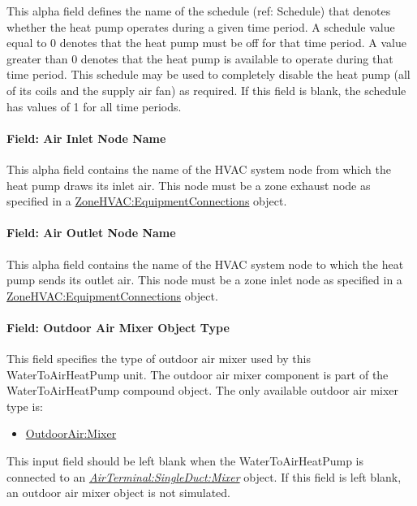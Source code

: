 This alpha field defines the name of the schedule (ref: Schedule) that denotes whether the heat pump operates during a given time period. A schedule value equal to 0 denotes that the heat pump must be off for that time period. A value greater than 0 denotes that the heat pump is available to operate during that time period. This schedule may be used to completely disable the heat pump (all of its coils and the supply air fan) as required. If this field is blank, the schedule has values of 1 for all time periods.

\paragraph{Field: Air Inlet Node Name}\label{field-air-inlet-node-name-8-000}

This alpha field contains the name of the HVAC system node from which the heat pump draws its inlet air. This node must be a zone exhaust node as specified in a \hyperref[zonehvacequipmentconnections]{ZoneHVAC:EquipmentConnections} object.

\paragraph{Field: Air Outlet Node Name}\label{field-air-outlet-node-name-8-001}

This alpha field contains the name of the HVAC system node to which the heat pump sends its outlet air. This node must be a zone inlet node as specified in a \hyperref[zonehvacequipmentconnections]{ZoneHVAC:EquipmentConnections} object.

\paragraph{Field: Outdoor Air Mixer Object Type}\label{field-outdoor-air-mixer-object-type-4}

This field specifies the type of outdoor air mixer used by this WaterToAirHeatPump unit. The outdoor air mixer component is part of the WaterToAirHeatPump compound object. The only available outdoor air mixer type is:

\begin{itemize}
\tightlist
\item
  \hyperref[outdoorairmixer]{OutdoorAir:Mixer}
\end{itemize}

This input field should be left blank when the WaterToAirHeatPump is connected to an \textit{\hyperref[airterminalsingleductmixer]{AirTerminal:SingleDuct:Mixer}} object. If this field is left blank, an outdoor air mixer object is not simulated.

